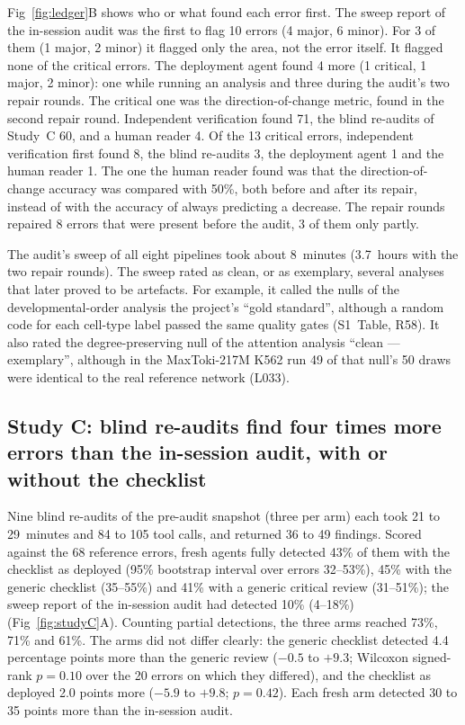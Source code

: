 \documentclass[10pt,letterpaper]{article}
\begin{document}
Fig~\ref{fig:ledger}B shows who or what found each error first. The
sweep report of the in-session audit was the first to flag 10 errors (4
major, 6 minor). For 3 of them (1 major, 2 minor) it flagged only the
area, not the error itself. It flagged none of the critical errors. The
deployment agent found 4 more (1 critical, 1 major, 2 minor): one while
running an analysis and three during the audit's two repair rounds. The
critical one was the direction-of-change metric, found in the second
repair round. Independent verification found 71, the blind re-audits of
Study~C 60, and a human reader 4. Of the 13 critical errors, independent
verification first found 8, the blind re-audits 3, the deployment agent 1
and the human reader 1. The one the human reader found was that the
direction-of-change accuracy was compared with 50\%, both before and after
its repair, instead of with the accuracy of always predicting a decrease.
The repair rounds repaired 8 errors that were present before the audit,
3 of them only partly.

The audit's sweep of all eight pipelines took about 8~minutes (3.7~hours
with the two repair rounds). The sweep rated as
clean, or as exemplary, several analyses that later proved to be
artefacts. For example, it called the nulls of the developmental-order
analysis the project's ``gold standard'', although a random code for each
cell-type label passed the same quality gates (S1~Table, R58). It also
rated the degree-preserving null of the attention analysis ``clean ---
exemplary'', although in the MaxToki-217M K562 run 49 of that null's 50
draws were identical to the real reference network (L033).

\subsection*{Study C: blind re-audits find four times more errors than the in-session audit, with or without the checklist}
Nine blind re-audits of the pre-audit snapshot (three per arm) each took
21 to 29~minutes and 84 to 105 tool calls, and returned 36 to 49
findings. Scored against the 68 reference errors, fresh agents fully
detected 43\% of them with the checklist as deployed (95\% bootstrap
interval over errors 32--53\%), 45\% with the generic checklist
(35--55\%) and 41\% with a generic critical review (31--51\%); the sweep
report of the in-session audit had detected 10\% (4--18\%)
(Fig~\ref{fig:studyC}A).
Counting partial detections, the three arms reached 73\%, 71\% and 61\%.
The arms did not differ clearly: the generic checklist detected 4.4
percentage points more than the generic review ($-0.5$ to $+9.3$;
Wilcoxon signed-rank $p=0.10$ over the 20 errors on which they differed),
and the checklist as deployed 2.0 points more ($-5.9$ to $+9.8$;
$p=0.42$). Each fresh arm detected 30 to 35 points more than the in-session
audit.
\end{document}
